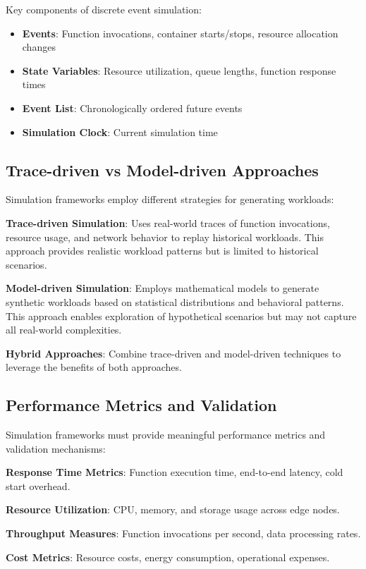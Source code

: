 Key components of discrete event simulation:
\begin{itemize}
    \item \textbf{Events}: Function invocations, container starts/stops, resource allocation changes
    \item \textbf{State Variables}: Resource utilization, queue lengths, function response times
    \item \textbf{Event List}: Chronologically ordered future events
    \item \textbf{Simulation Clock}: Current simulation time
\end{itemize}

\subsection{Trace-driven vs Model-driven Approaches}

Simulation frameworks employ different strategies for generating workloads:

\textbf{Trace-driven Simulation}: Uses real-world traces of function invocations, resource usage, and network behavior to replay historical workloads. This approach provides realistic workload patterns but is limited to historical scenarios.

\textbf{Model-driven Simulation}: Employs mathematical models to generate synthetic workloads based on statistical distributions and behavioral patterns. This approach enables exploration of hypothetical scenarios but may not capture all real-world complexities.

\textbf{Hybrid Approaches}: Combine trace-driven and model-driven techniques to leverage the benefits of both approaches.

\subsection{Performance Metrics and Validation}

Simulation frameworks must provide meaningful performance metrics and validation mechanisms:

\textbf{Response Time Metrics}: Function execution time, end-to-end latency, cold start overhead.

\textbf{Resource Utilization}: CPU, memory, and storage usage across edge nodes.

\textbf{Throughput Measures}: Function invocations per second, data processing rates.

\textbf{Cost Metrics}: Resource costs, energy consumption, operational expenses.


